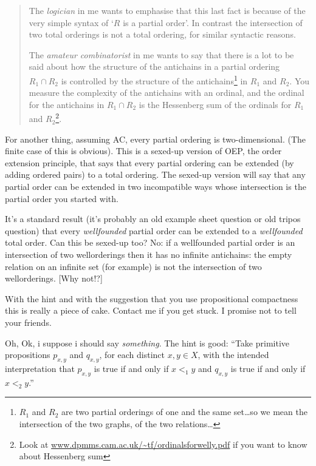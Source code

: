 \documentclass{book}
\begin{document}
\begin{quote}
The {\sl logician} in me wants to emphasise that this last fact is
because of the very simple syntax of `$R$ is a partial order'.  In
contrast the intersection of two total orderings is not a total
ordering, for similar syntactic reasons.

The {\sl amateur combinatorist} in me wants to say that there is a lot
to be said about how the structure of the antichains in a partial
ordering $R_1 \cap R_2$ is controlled by the structure of the
antichains\footnote{$R_1$ and $R_2$ are two partial orderings of one
  and the same set\ldots so we mean the intersection of the two
  graphs, of the two relations\ldots} in $R_1$ and $R_2$.  You measure
the complexity of the antichains with an ordinal, and the ordinal for
the antichains in $R_1\cap R_2$ is the Hessenberg sum of the ordinals
for $R_1$ and $R_2$\footnote{Look at
  \url{www.dpmms.cam.ac.uk/~tf/ordinalsforwelly.pdf} if you want to
  know about Hessenberg sum}.
\end{quote}

For another thing, assuming AC, every partial ordering is
two-dimensional.  (The finite case of this is obvious).  This is a
sexed-up version of OEP, the order extension principle, that says that
every partial ordering can be extended (by adding ordered pairs) to a
total ordering.  The sexed-up version will say that any partial order
can be extended in two incompatible ways whose intersection is the
partial order you started with.

It's a standard result (it's probably an old example sheet question or
old tripos question) that every {\sl wellfounded} partial order can be
extended to a {\sl wellfounded} total order.  Can this be sexed-up
too?  No: if a wellfounded partial order is an intersection of two
wellorderings then it has no infinite antichains: the empty relation
on an infinite set (for example) is not the intersection of two
wellorderings. [Why not!?]

\medskip

With the hint and with the suggestion that you use propositional
compactness this is really a piece of cake.  Contact me if you get
stuck.  I promise not to tell your friends.

\smallskip

Oh, Ok, i suppose i should say {\sl something}.  The hint is good:
``Take primitive propositions $p_{x,y}$ and $q_{x,y}$, for each distinct
$x,y \in X$, with the intended interpretation that $p_{x,y}$ is true if
and only if $x <_1 y$ and $q_{x,y}$ is true if and only if $x <_2y$.''
\smallskip
\end{document}
